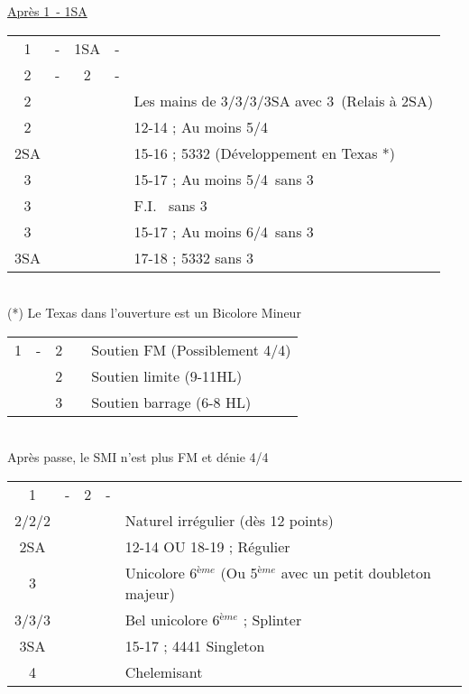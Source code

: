 \documentclass[a4paper, oneside, 11pt]{report}
\begin{document}
		\underline{Après 1\pique\ - 1SA}

		\begin{tabular}{cccc|l}
		1\pique & - & 1SA & - &\\
		2\trefle & - & 2\carreau & - &\\
		2\coeur &&&& Les mains de 3\trefle/3\carreau/3\pique/3SA avec 3\coeur\ (Relais à 2SA)\\
		2\pique &&&& 12-14 ; Au moins 5\pique/4\trefle\\
		2SA &&&& 15-16 ; 5332 (Développement en Texas *)\\
		3\trefle &&&& 15-17 ; Au moins 5\pique/4\trefle\ sans 3\coeur\\
		3\carreau &&&& F.I. \pique\ sans 3\coeur\\
		3\pique &&&& 15-17 ; Au moins 6\pique/4\trefle\ sans 3\coeur\\
		3SA &&&& 17-18 ; 5332 sans 3\coeur\\
		\end{tabular}\\
		(*) Le Texas dans l'ouverture est un Bicolore Mineur

		\begin{tabular}{cccc|l}
		1\trefle & - & 2\trefle && Soutien FM (Possiblement 4\coeur/4\pique)\\	
		&& 2\carreau && Soutien limite (9-11HL)\\
		&& 3\trefle && Soutien barrage (6-8 HL)\\
		\end{tabular}\\
		Après passe, le SMI n'est plus FM et dénie 4\coeur/4\pique\\
	
		\begin{tabular}{cccc|l}
		1\trefle & - & 2\trefle & - &\\
		2\carreau/2\coeur/2\pique &&&& Naturel irrégulier (dès 12 points)\\
		2SA &&&& 12-14 OU 18-19 ; Régulier\\
		3\trefle &&&& Unicolore 6$^{ème}$ (Ou 5$^{ème}$ avec un petit doubleton majeur)\\
		3\carreau/3\coeur/3\pique &&&& Bel unicolore 6$^{ème}$ ; Splinter\\
		3SA &&&& 15-17 ; 4441 Singleton \carreau\\
		4\trefle &&&& Chelemisant \trefle\\
		\end{tabular}\\\\
\end{document}
